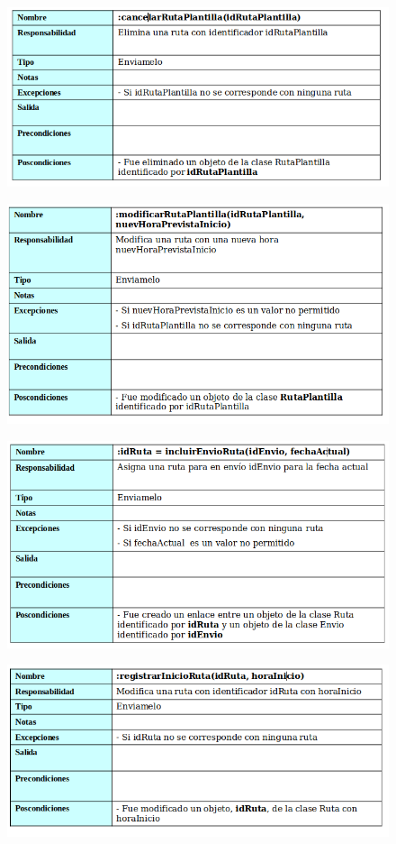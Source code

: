 \begin{figure}[H]
	\centering
	\includegraphics[width=16cm]{22}
\end{figure}
\begin{figure}[H]
	\centering
	\includegraphics[width=16cm]{23}
\end{figure}
\begin{figure}[H]
	\centering
	\includegraphics[width=16cm]{24}
\end{figure}
\begin{figure}[H]
	\centering
	\includegraphics[width=16cm]{25}
\end{figure}

